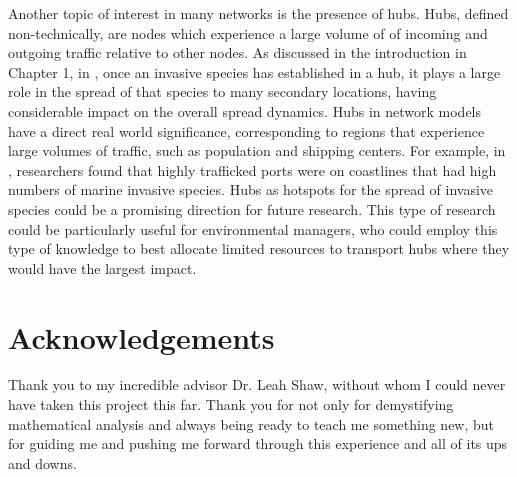 \documentclass[12pt, openany]{book}
\theoremstyle{definition}
\theoremstyle{remark}
\numberwithin{equation}{chapter}
\numberwithin{figure}{chapter}
\begin{document}
Another topic of interest in many networks is the presence of hubs. Hubs, defined non-technically, are nodes which experience a large volume of of incoming and outgoing traffic relative to other nodes. As discussed in the introduction in Chapter 1, in \cite{floerl2009importance}, once an invasive species has established in a hub, it plays a large role in the spread of that species to many secondary locations, having considerable impact on the overall spread dynamics. Hubs in network models have a direct real world significance, corresponding to regions that experience large volumes of traffic, such as population and shipping centers. For example, in \cite{kaluza2010complex}, researchers found that highly trafficked ports were on coastlines that had high numbers of marine invasive species. Hubs as hotspots for the spread of invasive species could be a promising direction for future research. This type of research could be particularly useful for environmental managers, who could employ this type of knowledge to best allocate limited resources to transport hubs where they would have the largest impact.

\section{Acknowledgements}

Thank you to my incredible advisor Dr. Leah Shaw, without whom I could never have taken this project this far. Thank you for not only for demystifying mathematical analysis and always being ready to teach me something new, but for guiding me and pushing me forward through this experience and all of its ups and downs.



\end{document}
